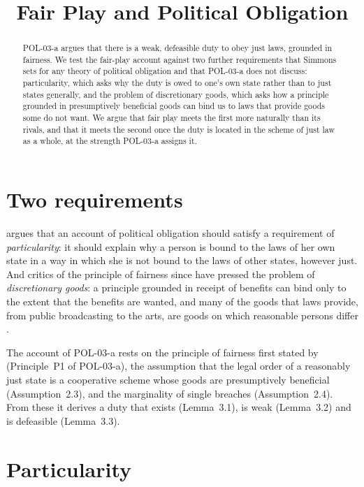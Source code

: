 \documentclass{situationist-preprint}
\title{Fair Play and Political Obligation}
\begin{document}
\maketitle

\begin{abstract}
POL-03-a argues that there is a weak, defeasible duty to obey just laws, grounded in fairness. We test the fair-play account against two further requirements that Simmons sets for any theory of political obligation and that POL-03-a does not discuss: particularity, which asks why the duty is owed to one's own state rather than to just states generally, and the problem of discretionary goods, which asks how a principle grounded in presumptively beneficial goods can bind us to laws that provide goods some do not want. We argue that fair play meets the first more naturally than its rivals, and that it meets the second once the duty is located in the scheme of just law as a whole, at the strength POL-03-a assigns it.
\end{abstract}

\section{Two requirements}

\citet{Simmons1979} argues that an account of political obligation should satisfy a requirement of \emph{particularity}: it should explain why a person is bound to the laws of her own state in a way in which she is not bound to the laws of other states, however just. And critics of the principle of fairness since \citet{Nozick1974} have pressed the problem of \emph{discretionary goods}: a principle grounded in receipt of benefits can bind only to the extent that the benefits are wanted, and many of the goods that laws provide, from public broadcasting to the arts, are goods on which reasonable persons differ \citep{Klosko1992}.

The account of POL-03-a rests on the principle of fairness first stated by \citet{Hart1955} (Principle~P1 of POL-03-a), the assumption that the legal order of a reasonably just state is a cooperative scheme whose goods are presumptively beneficial (Assumption~2.3), and the marginality of single breaches (Assumption~2.4). From these it derives a duty that exists (Lemma~3.1), is weak (Lemma~3.2) and is defeasible (Lemma~3.3).

\section{Particularity}
\end{document}
